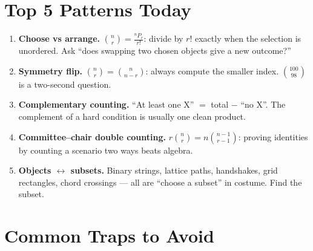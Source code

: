 \documentclass[11pt,a4paper]{article}
\begin{document}
\begin{enumerate}
\end{enumerate}

\section*{Top 5 Patterns Today}

\begin{enumerate}[leftmargin=2em, itemsep=4pt]
  \item \textbf{Choose vs arrange.} $\binom{n}{r}=\frac{{}^nP_r}{r!}$: divide by $r!$ exactly when the selection is unordered. Ask ``does swapping two chosen objects give a new outcome?'' 
  \item \textbf{Symmetry flip.} $\binom{n}{r}=\binom{n}{n-r}$: always compute the smaller index. $\binom{100}{98}$ is a two-second question. 
  \item \textbf{Complementary counting.} ``At least one X'' $=$ total $-$ ``no X''. The complement of a hard condition is usually one clean product. 
  \item \textbf{Committee--chair double counting.} $r\binom{n}{r}=n\binom{n-1}{r-1}$: proving identities by counting a scenario two ways beats algebra. 
  \item \textbf{Objects $\leftrightarrow$ subsets.} Binary strings, lattice paths, handshakes, grid rectangles, chord crossings --- all are ``choose a subset'' in costume. Find the subset. 
\end{enumerate}

\section*{Common Traps to Avoid}
\end{document}
